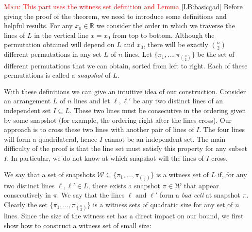 \documentclass[11pt,a4paper]{article}
\newcommand{\mati}[1]{\textcolor{red}{\textsc{Mati:} #1}}
\begin{document}
\mati{This part uses the witness set definition and Lemma \ref{LB:basicgad}}
\iffalse
Before giving the proof of the theorem, we need to introduce some definitions and helpful results. For any $x_0\in \mathbb{R}$ we consider the order in which we traverse the lines of $L$ in the vertical line $x=x_0$ from top to bottom. Although the permutation obtained will depend on $L$ and $x_0$, there will be exactly $n\choose 2$ different permutations in any set $L$ of $n$ lines. Let $\{\pi_1, \ldots, \pi_{n\choose 2}\}$ be the set of different permutations that we can obtain, sorted from left to right. Each of these permutations is called a {\em snapshot} of $L$.

With these definitions we can give an intuitive idea of our construction. Consider an arrangement $L$ of $n$ lines and let $\ell,\ell'$ be any two distinct lines of an independent set $I\subseteq L$. These two lines must be consecutive in the ordering given by some snapshot (for example, the ordering right after the lines cross). Our approach is to cross these two lines with another pair of lines of $I$. The four lines will form a quadrilateral, hence $I$ cannot be an independent set. The main difficulty of the proof is that the line set must satisfy this property for any subset $I$. In particular, we do not know at which snapshot will the lines of $I$ cross.

We say that a set of snapshots $\mathcal{W} \subseteq \{\pi_1, \ldots, \pi_{n\choose 2}\}$ is a witness set of $L$ if, for any two distinct lines $\ell,\ell'\in L$, there exists a snapshot $\pi\in \mathcal{W}$  that appear consecutively in $\pi$. We say that the lines $\ell$ and $\ell'$ form a {\em bad cell} at snapshot $\pi$. Clearly the set $\{\pi_1, \ldots, \pi_{n\choose 2}\}$ is a witness sets of quadratic size for any set of $n$ lines. Since the size of the witness set has a direct impact on our bound, we first show how to construct a witness set of small size:
\end{document}

